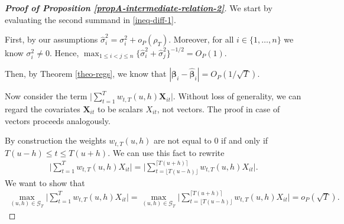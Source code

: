 \documentclass[a4paper,12pt]{article}
\begin{document}
\begin{proof}[\textnormal{\textbf{Proof of Proposition \ref{propA-intermediate-relation-2}}}]
We start by evaluating the second summand in \eqref{ineq-diff-1}.

First, by our assumptions $\widehat{\sigma}_i^2 = \sigma_i^2 + o_P(\rho_T)$. Moreover, for all $i \in \{1, \ldots, n\}$ we know $\sigma_i^2 \neq 0$. Hence, $\max_{1\le i < j \le n}\{\widehat{\sigma}_i^2+ \widehat{\sigma}_j^2 \}^{-1/2}  = O_P(1)$.

Then, by Theorem \ref{theo-regs}, we know that $|\bm{\beta}_i - \widehat{\bm{\beta}}_i| = O_P(1/\sqrt{T})$.

Now consider the term $\big| \sum_{t=1}^T w_{t,T}(u,h) \mathbf{X}_{it}  \big|$. Without loss of generality, we can regard the covariates $\mathbf{X}_{it}$ to be scalars $X_{it}$, not vectors. The proof in case of vectors proceeds analogously.

 
By construction the weights $w_{t, T}(u, h)$ are not equal to $0$ if and only if \linebreak $T(u-h) \le t \le T(u+h)$. We can use this fact to rewrite
\begin{align*}
\Big| \sum_{t=1}^T w_{t,T}(u,h) X_{it}   \Big|  = \Big| \sum_{t=\lfloor T(u-h) \rfloor}^{\lceil T(u+h) \rceil} w_{t,T}(u,h)X_{it}   \Big|.
\end{align*}
We want to show that 
\begin{align}\label{ineq-diff-2}
\max_{(u, h) \in \mathcal{G}_T} \Big| \sum_{t=1}^{T} w_{t,T}(u,h)X_{it} \Big| = \max_{(u, h) \in \mathcal{G}_T} \Big| \sum_{t=\lfloor T(u-h) \rfloor}^{\lceil T(u+h) \rceil} w_{t,T}(u,h)X_{it} \Big| = o_P({\sqrt{T}}).
\end{align}


\end{proof}
\end{document}
